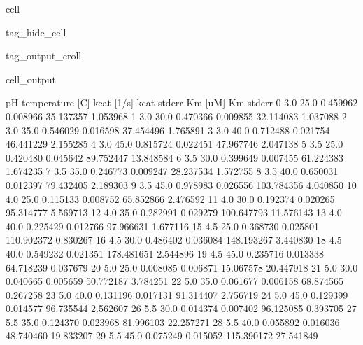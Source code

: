 \documentclass[letterpaper,12pt,english]{jupyterBook}
\begin{document}
\begin{sphinxuseclass}{cell}
\begin{sphinxuseclass}{tag_hide_cell}
\begin{sphinxuseclass}{tag_output_croll}
\begin{sphinxVerbatimOutput}
\begin{sphinxuseclass}{cell_output}
\begin{sphinxVerbatim}[commandchars=\\\{\}]
     pH  temperature [C]  kcat [1/s]  kcat stderr     Km [uM]  Km stderr  \PYGZbs{}
0   3.0             25.0    0.459962     0.008966   35.137357   1.053968   
1   3.0             30.0    0.470366     0.009855   32.114083   1.037088   
2   3.0             35.0    0.546029     0.016598   37.454496   1.765891   
3   3.0             40.0    0.712488     0.021754   46.441229   2.155285   
4   3.0             45.0    0.815724     0.022451   47.967746   2.047138   
5   3.5             25.0    0.420480     0.045642   89.752447  13.848584   
6   3.5             30.0    0.399649     0.007455   61.224383   1.674235   
7   3.5             35.0    0.246773     0.009247   28.237534   1.572755   
8   3.5             40.0    0.650031     0.012397   79.432405   2.189303   
9   3.5             45.0    0.978983     0.026556  103.784356   4.040850   
10  4.0             25.0    0.115133     0.008752   65.852866   2.476592   
11  4.0             30.0    0.192374     0.020265   95.314777   5.569713   
12  4.0             35.0    0.282991     0.029279  100.647793  11.576143   
13  4.0             40.0    0.225429     0.012766   97.966631   1.677116   
15  4.5             25.0    0.368730     0.025801  110.902372   0.830267   
16  4.5             30.0    0.486402     0.036084  148.193267   3.440830   
18  4.5             40.0    0.549232     0.021351  178.481651   2.544896   
19  4.5             45.0    0.235716     0.013338   64.718239   0.037679   
20  5.0             25.0    0.008085     0.006871   15.067578  20.447918   
21  5.0             30.0    0.040665     0.005659   50.772187   3.784251   
22  5.0             35.0    0.061677     0.006158   68.874565   0.267258   
23  5.0             40.0    0.131196     0.017131   91.314407   2.756719   
24  5.0             45.0    0.129399     0.014577   96.735544   2.562607   
26  5.5             30.0    0.014374     0.007402   96.125085   0.393705   
27  5.5             35.0    0.124370     0.023968   81.996103  22.257271   
28  5.5             40.0    0.055892     0.016036   48.740460  19.833207   
29  5.5             45.0    0.075249     0.015052  115.390172  27.541849   


\end{sphinxVerbatim}
\end{sphinxuseclass}
\end{sphinxVerbatimOutput}
\end{sphinxuseclass}
\end{sphinxuseclass}
\end{sphinxuseclass}
\end{document}
